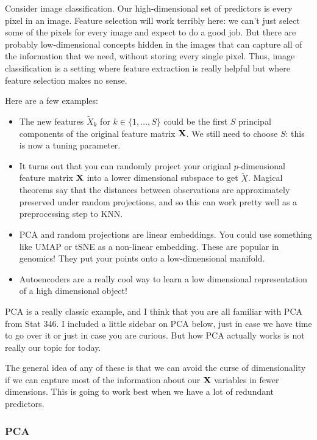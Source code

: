 Consider image classification. Our high-dimensional set of predictors is every pixel in an image. Feature selection will work terribly here: we can't just select some of the pixels for every image and expect to do a good job. But there are probably low-dimensional concepts hidden in the images that can capture all of the information that we need, without storing every single pixel. Thus, image classification is a setting where feature extraction is really helpful but where feature selection makes no sense.

Here are a few examples:

\begin{itemize}
\item The new features $\tilde{X}_k$ for  $k \in \{1,\ldots, S\}$ could be the first $S$ principal components of the original feature matrix $\bold{X}$. We still need to choose $S$: this is now a tuning parameter. 
\item It turns out that you can randomly project your original $p$-dimensional feature matrix $\bold{X}$ into a lower dimensional subspace to get $\tilde{X}$. Magical theorems say that the distances between observations are approximately preserved under random projections, and so this can work pretty well as a preprocessing step to KNN. 
\item PCA and random projections are linear embeddings. You could use something like UMAP or tSNE as a non-linear embedding. These are popular in genomics! They put your points onto a low-dimensional manifold. 
\item Autoencoders are a really cool way to learn a low dimensional representation of a high dimensional object! 
\end{itemize}

PCA is a really classic example, and I think that you are all familiar with PCA from Stat 346. I included a little sidebar on PCA below, just in case we have time to go over it or just in case you are curious. But how PCA actually works is not really our topic for today. 

The general idea of any of these is that we can avoid the curse of dimensionality if we can capture most of the information about our $\bold{X}$ variables in fewer dimensions. This is going to work best when we have a lot of redundant predictors. 

\subsubsection{PCA}

